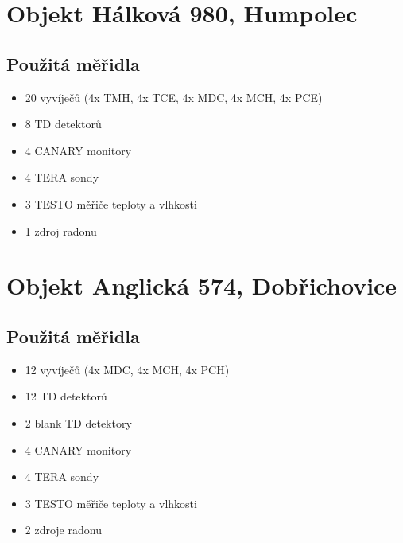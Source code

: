 
\section{Objekt Hálková 980, Humpolec}
\subsection{Použitá měřidla}
\begin{itemize}
    \setlength\itemsep{0em}
	\item 20 vyvíječů (4x TMH, 4x TCE, 4x MDC, 4x MCH, 4x PCE)
	\item 8 TD detektorů
	\item 4 CANARY monitory
	\item 4 TERA sondy
	\item 3 TESTO měřiče teploty a vlhkosti
	\item 1 zdroj radonu
\end{itemize}

\section{Objekt Anglická 574, Dobřichovice}
\subsection{Použitá měřidla}
\begin{itemize}
    \setlength\itemsep{0em}
	\item 12 vyvíječů (4x MDC, 4x MCH, 4x PCH)
	\item 12 TD detektorů
	\item 2 blank TD detektory 
	\item 4 CANARY monitory
	\item 4 TERA sondy
	\item 3 TESTO měřiče teploty a vlhkosti
	\item 2 zdroje radonu
\end{itemize}
